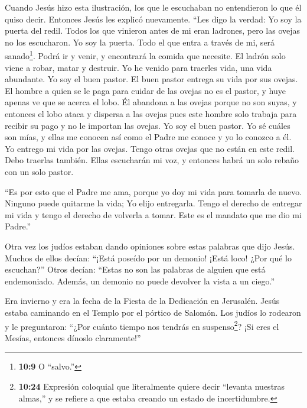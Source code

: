  Cuando Jesús hizo esta ilustración, los que le escuchaban
no entendieron lo que él quiso decir.  Entonces Jesús les
explicó nuevamente. ``Les digo la verdad: Yo soy la puerta del redil.
 Todos los que vinieron antes de mi eran ladrones, pero las
ovejas no los escucharon.  Yo soy la puerta. Todo el que
entra a través de mi, será sanado\footnote{\textbf{10:9} O ``salvo.''}.
Podrá ir y venir, y encontrará la comida que necesite.  El
ladrón solo viene a robar, matar y destruir. Yo he venido para traerles
vida, una vida abundante.  Yo soy el buen pastor. El buen
pastor entrega su vida por sus ovejas.  El hombre a quien
se le paga para cuidar de las ovejas no es el pastor, y huye apenas ve
que se acerca el lobo. Él abandona a las ovejas porque no son suyas, y
entonces el lobo ataca y dispersa a las ovejas  pues este
hombre solo trabaja para recibir su pago y no le importan las ovejas.
 Yo soy el buen pastor. Yo sé cuáles son mías, y ellas me
conocen  así como el Padre me conoce y yo lo conozco a él.
Yo entrego mi vida por las ovejas.  Tengo otras ovejas que
no están en este redil. Debo traerlas también. Ellas escucharán mi voz,
y entonces habrá un solo rebaño con un solo pastor.

 ``Es por esto que el Padre me ama, porque yo doy mi vida
para tomarla de nuevo.  Ninguno puede quitarme la vida; Yo
elijo entregarla. Tengo el derecho de entregar mi vida y tengo el
derecho de volverla a tomar. Este es el mandato que me dio mi Padre.''

 Otra vez los judíos estaban dando opiniones sobre estas
palabras que dijo Jesús.  Muchos de ellos decían: ``¡Está
poseído por un demonio! ¡Está loco! ¿Por qué lo escuchan?''
 Otros decían: ``Estas no son las palabras de alguien que
está endemoniado. Además, un demonio no puede devolver la vista a un
ciego.''

 Era invierno y era la fecha de la Fiesta de la Dedicación
en Jerusalén.  Jesús estaba caminando en el Templo por el
pórtico de Salomón. Los judíos lo rodearon y le preguntaron:
 ``¿Por cuánto tiempo nos tendrás en suspenso\footnote{\textbf{10:24}
  Expresión coloquial que literalmente quiere decir ``levanta nuestras
  almas,'' y se refiere a que estaba creando un estado de incertidumbre.}?
¡Si eres el Mesías, entonces dínoslo claramente!''


